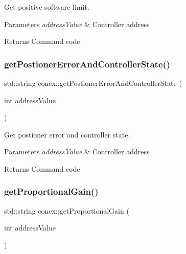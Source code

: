 Get positive software limit. 


\begin{DoxyParams}{Parameters}
{\em address\+Value} & Controller address \\
\hline
\end{DoxyParams}
\begin{DoxyReturn}{Returns}
Command code 
\end{DoxyReturn}
\mbox{\label{namespaceconex_ab160c5ab9d6870ec2fdf198fede98ebd}} 
\subsubsection{\texorpdfstring{get\+Postioner\+Error\+And\+Controller\+State()}{getPostionerErrorAndControllerState()}}
{\footnotesize\ttfamily std\+::string conex\+::get\+Postioner\+Error\+And\+Controller\+State (\begin{DoxyParamCaption}\item[{int}]{address\+Value }\end{DoxyParamCaption})}



Get postioner error and controller state. 


\begin{DoxyParams}{Parameters}
{\em address\+Value} & Controller address \\
\hline
\end{DoxyParams}
\begin{DoxyReturn}{Returns}
Command code 
\end{DoxyReturn}
\mbox{\label{namespaceconex_a0ed457be041ec821472eb60ef3f7768d}} 
\subsubsection{\texorpdfstring{get\+Proportional\+Gain()}{getProportionalGain()}}
{\footnotesize\ttfamily std\+::string conex\+::get\+Proportional\+Gain (\begin{DoxyParamCaption}\item[{int}]{address\+Value }\end{DoxyParamCaption})}



